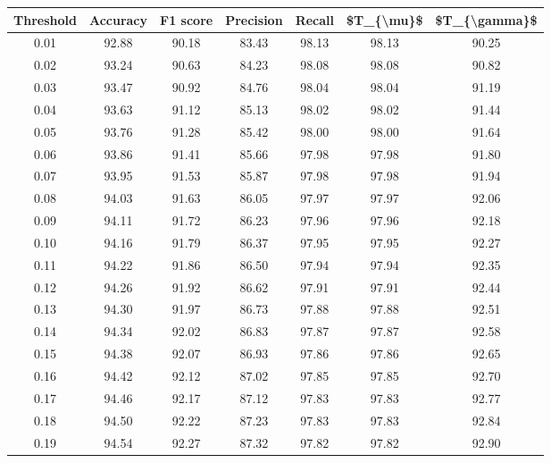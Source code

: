 \begin{tabular}{|c|c|c|c|c|c|c|}
\hline
 Threshold &  Accuracy &  F1 score &  Precision &  Recall &  \$T\_\{\textbackslash mu\}\$ &  \$T\_\{\textbackslash gamma\}\$ \\
\hline
      0.01 &     92.88 &     90.18 &      83.43 &   98.13 &      98.13 &         90.25 \\
      0.02 &     93.24 &     90.63 &      84.23 &   98.08 &      98.08 &         90.82 \\
      0.03 &     93.47 &     90.92 &      84.76 &   98.04 &      98.04 &         91.19 \\
      0.04 &     93.63 &     91.12 &      85.13 &   98.02 &      98.02 &         91.44 \\
      0.05 &     93.76 &     91.28 &      85.42 &   98.00 &      98.00 &         91.64 \\
      0.06 &     93.86 &     91.41 &      85.66 &   97.98 &      97.98 &         91.80 \\
      0.07 &     93.95 &     91.53 &      85.87 &   97.98 &      97.98 &         91.94 \\
      0.08 &     94.03 &     91.63 &      86.05 &   97.97 &      97.97 &         92.06 \\
      0.09 &     94.11 &     91.72 &      86.23 &   97.96 &      97.96 &         92.18 \\
      0.10 &     94.16 &     91.79 &      86.37 &   97.95 &      97.95 &         92.27 \\
      0.11 &     94.22 &     91.86 &      86.50 &   97.94 &      97.94 &         92.35 \\
      0.12 &     94.26 &     91.92 &      86.62 &   97.91 &      97.91 &         92.44 \\
      0.13 &     94.30 &     91.97 &      86.73 &   97.88 &      97.88 &         92.51 \\
      0.14 &     94.34 &     92.02 &      86.83 &   97.87 &      97.87 &         92.58 \\
      0.15 &     94.38 &     92.07 &      86.93 &   97.86 &      97.86 &         92.65 \\
      0.16 &     94.42 &     92.12 &      87.02 &   97.85 &      97.85 &         92.70 \\
      0.17 &     94.46 &     92.17 &      87.12 &   97.83 &      97.83 &         92.77 \\
      0.18 &     94.50 &     92.22 &      87.23 &   97.83 &      97.83 &         92.84 \\
      0.19 &     94.54 &     92.27 &      87.32 &   97.82 &      97.82 &         92.90 \\

\end{tabular}
